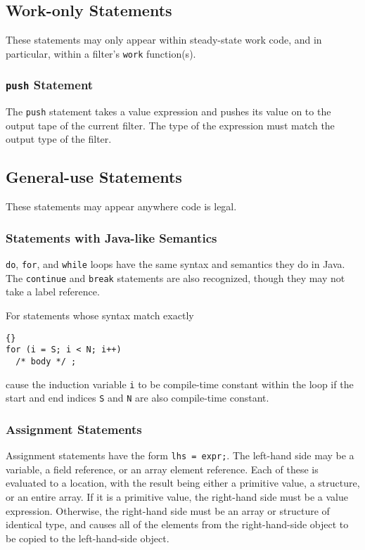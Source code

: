 \documentclass[11pt]{article}
\begin{document}
\subsection{Work-only Statements}

These statements may only appear within steady-state work code, and in
particular, within a filter's \lstinline|work| function(s).

\subsubsection{\lstinline|push| Statement}

The \lstinline|push| statement takes a value expression and pushes its
value on to the output tape of the current filter.  The type of the
expression must match the output type of the filter.

\subsection{General-use Statements}

These statements may appear anywhere code is legal.

\subsubsection{Statements with Java-like Semantics}

\lstinline|do|, \lstinline|for|, and \lstinline|while| loops have the same
syntax and semantics they do in Java.  The \lstinline|continue| and
\lstinline|break| statements are also recognized, though they may not
take  a label reference.

For statements whose syntax match exactly

\begin{lstlisting}{}
for (i = S; i < N; i++)
  /* body */ ;
\end{lstlisting}

\noindent
cause the induction variable \lstinline|i| to be compile-time constant
within the loop if the start and end indices \lstinline|S| and \lstinline|N| are
also compile-time constant.

\subsubsection{Assignment Statements}

Assignment statements have the form \lstinline|lhs = expr;|.  The left-hand
side may be a variable, a field reference, or an array element
reference.  Each of these is evaluated to a location, with the result
being either a primitive value, a structure, or an entire array.  If
it is a primitive value, the right-hand side must be a value
expression.  Otherwise, the right-hand side must be an array or
structure of identical type, and causes all of the elements from the
right-hand-side object to be copied to the left-hand-side object.
\end{document}
